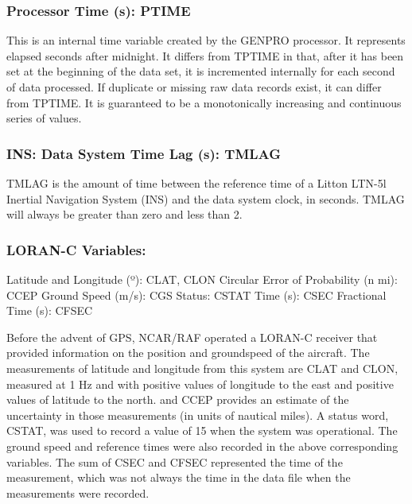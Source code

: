 \documentclass[
  english,
]{book}
\begin{document}
\hypertarget{ptime}{%
\subsubsection*{Processor Time (s): PTIME}\label{ptime}}

This is an internal time variable created by the GENPRO processor. It represents elapsed seconds after midnight. It differs from TPTIME in that, after it has been set at the beginning of the data set, it is incremented internally for each second of data processed. If duplicate or missing raw data records exist, it can differ from TPTIME. It is guaranteed to be a monotonically increasing and continuous series of values.

\hypertarget{tmlag}{%
\subsubsection*{INS: Data System Time Lag (s): TMLAG}\label{tmlag}}

TMLAG is the amount of time between the reference time of a Litton LTN-5l Inertial Navigation System (INS) and the data system clock, in seconds. TMLAG will always be greater than zero and less than 2.

\hypertarget{loranc}{%
\subsubsection*{LORAN-C Variables:}\label{loranc}}

Latitude and Longitude ({º}): CLAT, CLON
Circular Error of Probability (n mi): CCEP
Ground Speed (m/s): CGS
Status: CSTAT
Time (s): CSEC
Fractional Time (s): CFSEC

Before the advent of GPS, NCAR/RAF operated a LORAN-C receiver that provided information on the position and groundspeed of the aircraft. The measurements of latitude and longitude from this system are CLAT and CLON, measured at 1 Hz and with positive values of longitude to the east and positive values of latitude to the north. and CCEP provides an estimate of the uncertainty in those measurements (in units of nautical miles). A status word, CSTAT, was used to record a value of 15 when the system was operational. The ground speed and reference times were also recorded in the above corresponding variables. The sum of CSEC and CFSEC represented the time of the measurement, which was not always the time in the data file when the measurements were recorded.
\end{document}
